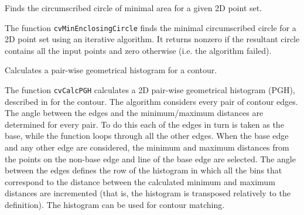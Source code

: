Finds the circumscribed circle of minimal area for a given 2D point set.


\begin{description}
\end{description}

The function \texttt{cvMinEnclosingCircle} finds the minimal circumscribed
circle for a 2D point set using an iterative algorithm. It returns nonzero
if the resultant circle contains all the input points and zero otherwise
(i.e. the algorithm failed).

\label{CalcPGH}

Calculates a pair-wise geometrical histogram for a contour.


\begin{description}
\end{description}

The function \texttt{cvCalcPGH} calculates a
2D pair-wise geometrical histogram (PGH), described in
for the contour. The algorithm considers every pair of contour
edges. The angle between the edges and the minimum/maximum distances
are determined for every pair. To do this each of the edges in turn
is taken as the base, while the function loops through all the other
edges. When the base edge and any other edge are considered, the minimum
and maximum distances from the points on the non-base edge and line of
the base edge are selected. The angle between the edges defines the row
of the histogram in which all the bins that correspond to the distance
between the calculated minimum and maximum distances are incremented
(that is, the histogram is transposed relatively to the 
definition). The histogram can be used for contour matching.

